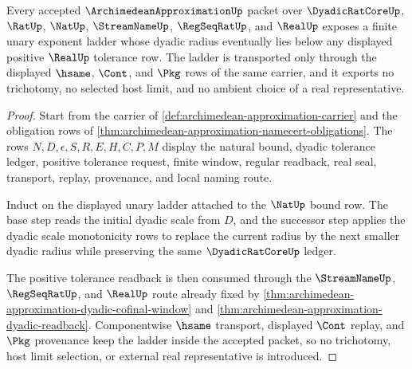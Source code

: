 \begin{theorem}
\label{thm:archimedean-approximation-dyadic-upper-ladder}
Every accepted $\ArchimedeanApproximationUp$ packet over $\DyadicRatCoreUp$, $\RatUp$, $\NatUp$, $\StreamNameUp$, $\RegSeqRatUp$, and $\RealUp$ exposes a finite unary exponent ladder whose dyadic radius eventually lies below any displayed positive $\RealUp$ tolerance row. The ladder is transported only through the displayed $\hsame$, $\Cont$, and $\Pkg$ rows of the same carrier, and it exports no trichotomy, no selected host limit, and no ambient choice of a real representative.
\end{theorem}
\begin{proof}
Start from the carrier of \autoref{def:archimedean-approximation-carrier} and the obligation rows of \autoref{thm:archimedean-approximation-namecert-obligations}. The rows $N,D,\epsilon,S,R,E,H,C,P,M$ display the natural bound, dyadic tolerance ledger, positive tolerance request, finite window, regular readback, real seal, transport, replay, provenance, and local naming route.

Induct on the displayed unary ladder attached to the $\NatUp$ bound row. The base step reads the initial dyadic scale from $D$, and the successor step applies the dyadic scale monotonicity rows to replace the current radius by the next smaller dyadic radius while preserving the same $\DyadicRatCoreUp$ ledger.

The positive tolerance readback is then consumed through the $\StreamNameUp$, $\RegSeqRatUp$, and $\RealUp$ route already fixed by \autoref{thm:archimedean-approximation-dyadic-cofinal-window} and \autoref{thm:archimedean-approximation-dyadic-readback}. Componentwise $\hsame$ transport, displayed $\Cont$ replay, and $\Pkg$ provenance keep the ladder inside the accepted packet, so no trichotomy, host limit selection, or external real representative is introduced.
\end{proof}

